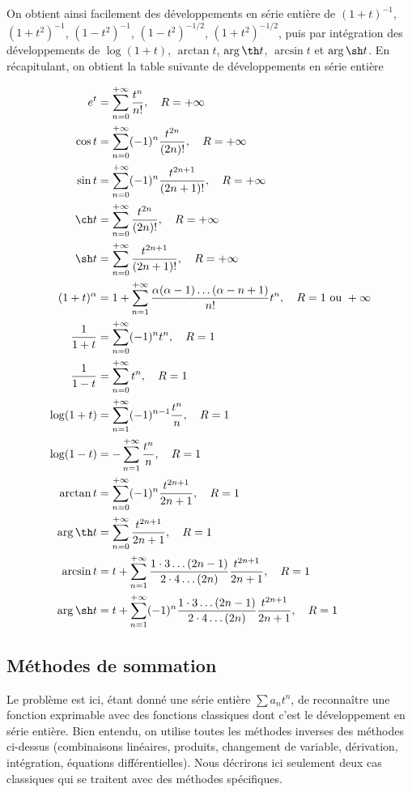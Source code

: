 On obtient ainsi facilement des développements en série entière de $(1+t)^{-1}$, $(1+t^2)^{-1}$, $(1-t^2)^{-1}$, $(1-t^2)^{-1/2}$, $(1+t^2)^{-1/2}$, puis par intégration des développements de $\log(1+t)$, $\arctan t$, $\arg\th t$, $\arcsin t$ et $\arg\sh t$. En récapitulant, on obtient la table suivante de développements en série entière

\begin{align*}
e^t &= \sum_{n=0}^{+\infty} \frac{t^n}{n!}, \quad R = +\infty \\
\cos t &= \sum_{n=0}^{+\infty} (-1)^n \frac{t^{2n}}{(2n)!}, \quad R = +\infty \\
\sin t &= \sum_{n=0}^{+\infty} (-1)^n \frac{t^{2n+1}}{(2n+1)!}, \quad R = +\infty \\
\ch t &= \sum_{n=0}^{+\infty} \frac{t^{2n}}{(2n)!}, \quad R = +\infty \\
\sh t &= \sum_{n=0}^{+\infty} \frac{t^{2n+1}}{(2n+1)!}, \quad R = +\infty \\
(1+t)^\alpha &= 1 + \sum_{n=1}^{+\infty} \frac{\alpha(\alpha-1)\ldots(\alpha-n+1)}{n!} t^n, \quad R = 1 \text{ ou } +\infty \\
\frac{1}{1+t} &= \sum_{n=0}^{+\infty} (-1)^n t^n, \quad R = 1 \\
\frac{1}{1-t} &= \sum_{n=0}^{+\infty} t^n, \quad R = 1 \\
\log(1+t) &= \sum_{n=1}^{+\infty} (-1)^{n-1} \frac{t^n}{n}, \quad R = 1 \\
\log(1-t) &= -\sum_{n=1}^{+\infty} \frac{t^n}{n}, \quad R = 1 \\
\arctan t &= \sum_{n=0}^{+\infty} (-1)^n \frac{t^{2n+1}}{2n+1}, \quad R = 1 \\
\arg\th t &= \sum_{n=0}^{+\infty} \frac{t^{2n+1}}{2n+1}, \quad R = 1 \\
\arcsin t &= t + \sum_{n=1}^{+\infty} \frac{1\cdot3\ldots(2n-1)}{2\cdot4\ldots(2n)} \frac{t^{2n+1}}{2n+1}, \quad R = 1 \\
\arg\sh t &= t + \sum_{n=1}^{+\infty} (-1)^n \frac{1\cdot3\ldots(2n-1)}{2\cdot4\ldots(2n)} \frac{t^{2n+1}}{2n+1}, \quad R = 1
\end{align*}

\subsection{Méthodes de sommation}

Le problème est ici, étant donné une série entière $\sum a_n t^n$, de reconnaître une fonction exprimable avec des fonctions classiques dont c'est le développement en série entière. Bien entendu, on utilise toutes les méthodes inverses des méthodes ci-dessus (combinaisons linéaires, produits, changement de variable, dérivation, intégration, équations différentielles). Nous décrirons ici seulement deux cas classiques qui se traitent avec des méthodes spécifiques.

